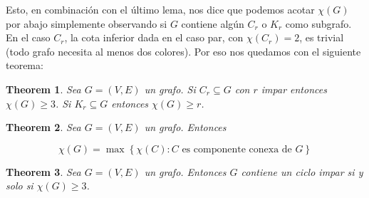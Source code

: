 \documentclass[a4paper]{article}
\newtheorem{theorem}{Theorem}
\newtheorem{theorem}{Theorem}
\begin{document}
Esto, en combinación con el último lema, nos dice que podemos acotar $\chi(G)$
por abajo simplemente observando si $G$ contiene algún $C_r$  o $K_r$ como
subgrafo. En el caso $C_r$, la cota inferior dada en el caso par, con $\chi(C_r)
= 2$, es trivial (todo grafo necesita al menos dos colores). Por eso nos
quedamos con el siguiente teorema: 

\begin{theorem}
    Sea $G = (V, E) $ un grafo. Si $C_r \subseteq G$ con $r$ impar entonces
    $\chi(G) \geq 3$. Si $K_r \subseteq G$ entonces $\chi(G) \geq r$.
\end{theorem}

\begin{theorem}
    
    Sea $G = (V, E) $ un grafo. Entonces 

    $$\chi(G) = \max \left\{ \chi(C) : C \text{ es componente
conexa de  } G \right\} $$

\end{theorem}


\begin{theorem}
    Sea $G = (V, E) $ un grafo. Entonces $G$ contiene un ciclo impar si y solo
    si $\chi(G) \geq 3$.
\end{theorem}
\end{document}
